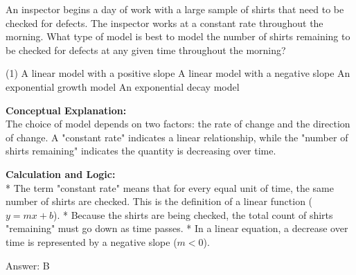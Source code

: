 \documentclass[11pt,paper=a4,answers]{exam}
\begin{document}
\begin{questions}
\pointsinrightmargin
\pointsdroppedatright
\marksnotpoints
{}
\pointformat{\boldmath\themarginpoints}
\bracketedpoints


\question
An inspector begins a day of work with a large sample of shirts that need to be checked for defects. The inspector works at a constant rate throughout the morning. What type of model is best to model the number of shirts remaining to be checked for defects at any given time throughout the morning?
\begin{tasks}(1)
    \task A linear model with a positive slope
    \task A linear model with a negative slope
    \task An exponential growth model
    \task An exponential decay model
\end{tasks}

\begin{solution}
\textbf{Conceptual Explanation:} \\
The choice of model depends on two factors: the rate of change and the direction of change. A "constant rate" indicates a linear relationship, while the "number of shirts remaining" indicates the quantity is decreasing over time.

\vspace{30pt}

\textbf{Calculation and Logic:} \\
* The term "constant rate" means that for every equal unit of time, the same number of shirts are checked. This is the definition of a linear function ($y = mx + b$).
* Because the shirts are being checked, the total count of shirts "remaining" must go down as time passes.
* In a linear equation, a decrease over time is represented by a negative slope ($m < 0$).

\vspace{30pt}

Answer: \colorbox{yellow!100}{B}
\end{solution}

\vspace{60pt}


\end{questions}
\end{document}
